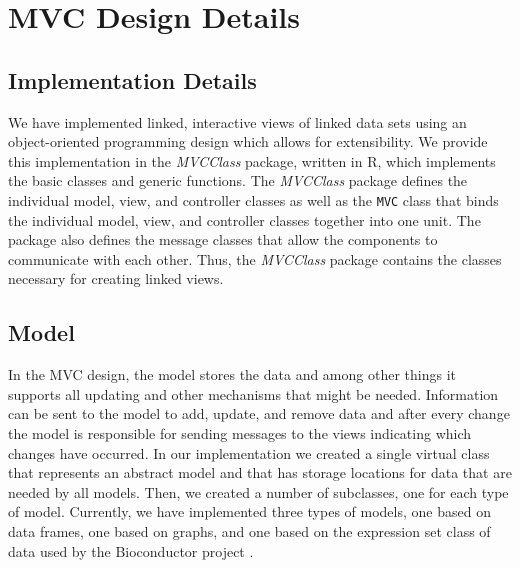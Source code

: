 \documentclass[11pt]{article}
\newcommand{\Rpackage}[1]{{\textit{#1}}}
\newcommand{\Rclass}[1]{\texttt{#1}}
\begin{document}
\section{MVC Design Details}
\label{Sec:OneMVC}

\subsection{Implementation Details}
\label{SSec:OneOver}

We have implemented linked, interactive views of linked data sets
using an object-oriented programming design which allows for
extensibility.  We provide this implementation in the
\Rpackage{MVCClass} package, written in R, which implements the basic
classes and generic functions.  The \Rpackage{MVCClass} package
defines the individual model, view, and controller classes as well as
the \Rclass{MVC} class that binds the individual model, view, and
controller classes together into one unit.  The package also defines
the message classes that allow the components to communicate with each
other.  Thus, the \Rpackage{MVCClass} package contains the classes
necessary for creating linked views.

\subsection{Model}
\label{Ssec:OneModel}

In the MVC design, the model stores the data and among other things it
supports all updating and other mechanisms that might be needed.
Information can be sent to the model to add, update, and remove data
and after every change the model is responsible for sending messages
to the views indicating which changes have occurred.  In our
implementation we created a single virtual class that represents an
abstract model and that has storage locations for data that are
needed by all models.  Then, we created a number of subclasses, one for
each type of model.  Currently, we have implemented three types of models, 
one based on data frames, one based on graphs, and one based on the 
expression set class of data used by the Bioconductor project \citep{BIOC}.


\end{document}
